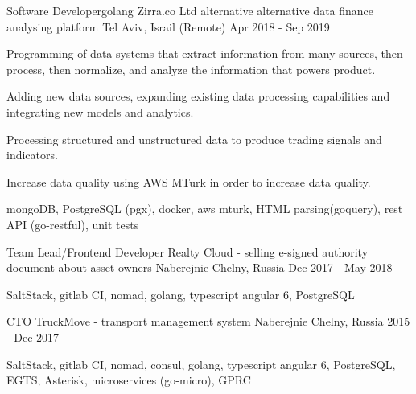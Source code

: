 \begin{cventries}
  \cventry
    {Software Developer{\enskip\cdotp\enskip}golang} %
    {Zirra.co Ltd alternative alternative data finance analysing platform} %
    {Tel Aviv, Israil (Remote)} %
    {Apr 2018 - Sep 2019} %
    {
      \begin{cvitems} %
        \item {Programming of data systems that extract information from many sources, then process, then normalize, and analyze the information that powers product.}
        \item {Adding new data sources, expanding existing data processing capabilities and integrating new models and analytics.}
        \item {Processing structured and unstructured data to produce trading signals and indicators.}
        \item {Increase data quality using AWS MTurk in order to increase data quality.}
        \item {mongoDB, PostgreSQL (pgx), docker, aws mturk, HTML parsing(goquery), rest API (go-restful), unit tests}
      \end{cvitems}
    }

  \cventry
    {Team Lead/Frontend Developer} %
    {Realty Cloud - selling e-signed authority document about asset owners} %
    {Naberejnie Chelny, Russia} %
    {Dec 2017 - May 2018} %
    {
      \begin{cvitems} %
        \item {SaltStack, gitlab CI, nomad, golang, typescript angular 6, PostgreSQL}
      \end{cvitems}
    }

  \cventry
    {CTO} %
    {TruckMove - transport management system} %
    {Naberejnie Chelny, Russia} %
    {2015 - Dec 2017} %
    {
      \begin{cvitems} %
        \item {SaltStack, gitlab CI, nomad, consul, golang, typescript angular 6, PostgreSQL, EGTS, Asterisk, microservices (go-micro), GPRC}
      \end{cvitems}
    }


\end{cventries}
